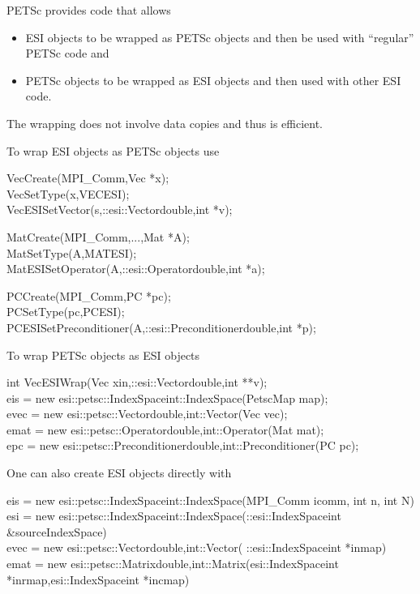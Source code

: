 PETSc provides code that allows
\begin{itemize}
\item  ESI objects to be wrapped as PETSc objects
      and then be used with ``regular'' PETSc code and
\item PETSc objects to be wrapped as ESI objects and then used with other
      ESI code.
\end{itemize}
The wrapping does not involve data copies and thus is efficient.

To wrap ESI objects as PETSc objects use
\begin{tabbing}
VecCreate(MPI\_Comm,Vec *x);\\
VecSetType(x,VECESI);\\
VecESISetVector(s,::esi::Vector\trl{<}double,int\trl{>} *v);
\end{tabbing}

\begin{tabbing}
MatCreate(MPI\_Comm,...,Mat *A);\\
MatSetType(A,MATESI);\\
MatESISetOperator(A,::esi::Operator\trl{<}double,int\trl{>} *a);
\end{tabbing}

\begin{tabbing}
PCCreate(MPI\_Comm,PC *pc);\\
PCSetType(pc,PCESI);\\
PCESISetPreconditioner(A,::esi::Preconditioner\trl{<}double,int\trl{>} *p);
\end{tabbing}

To wrap PETSc objects as ESI objects
\begin{tabbing}
int VecESIWrap(Vec xin,::esi::Vector\trl{<}double,int\trl{>} **v);\\
eis  = new esi::petsc::IndexSpace\trl{<}int\trl{>}::IndexSpace(PetscMap map);\\
evec = new esi::petsc::Vector\trl{<}double,int\trl{>}::Vector(Vec vec);\\
emat = new esi::petsc::Operator\trl{<}double,int\trl{>}::Operator(Mat mat);\\
epc  = new esi::petsc::Preconditioner\trl{<}double,int\trl{>}::Preconditioner(PC pc);
\end{tabbing}

One can also create ESI objects directly with 
\begin{tabbing}
eis  = new esi::petsc::IndexSpace\trl{<}int\trl{>}::IndexSpace(MPI\_Comm icomm, int n, int N)\\
esi  = new esi::petsc::IndexSpace\trl{<}int\trl{>}::IndexSpace(::esi::IndexSpace\trl{<}int\trl{>} \&sourceIndexSpace)\\
evec = new esi::petsc::Vector\trl{<}double,int\trl{>}::Vector( ::esi::IndexSpace\trl{<}int\trl{>} *inmap)\\
emat = new esi::petsc::Matrix\trl{<}double,int\trl{>}::Matrix(esi::IndexSpace\trl{<}int\trl{>} *inrmap,esi::IndexSpace\trl{<}int\trl{>} *incmap)
\end{tabbing}


